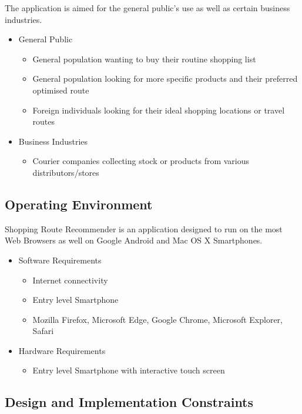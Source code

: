 \documentclass[10pt, a4paper, onecolumn]{scrartcl}
\begin{document}
			The application is aimed for the general public's use as well as certain business industries. 
			
			\begin{itemize}
				\item General Public
				\begin{itemize}
					\item General population wanting to buy their routine shopping list
					\item General population looking for more specific products and their preferred optimised route
					\item Foreign individuals looking for their ideal shopping locations or travel routes
				\end{itemize}
				\item Business Industries
				\begin{itemize}
					\item Courier companies collecting stock or products from various distributors/stores
				\end{itemize}
			\end{itemize}
		
		\subsection{Operating Environment}
		
			Shopping Route Recommender is an application designed to run on the most Web Browsers as well on Google Android and Mac OS X Smartphones. 
			
			\begin{itemize}
				\item Software Requirements
				\begin{itemize}
					\item Internet connectivity
					\item Entry level Smartphone
					\item Mozilla Firefox, Microsoft Edge, Google Chrome, Microsoft Explorer, Safari
				\end{itemize}
				\item Hardware Requirements
				\begin{itemize}
					\item Entry level Smartphone with interactive touch screen
				\end{itemize}
			\end{itemize}
		
		\subsection{Design and Implementation Constraints}
		
\end{document}
